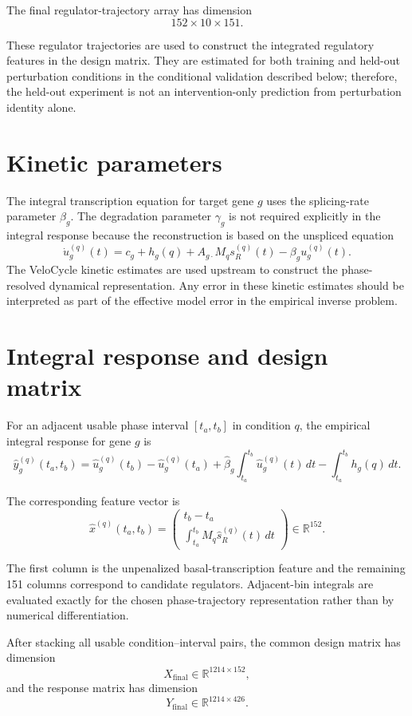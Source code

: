 \documentclass[supplement,onefignum,onetabnum]{siamart251216}
\begin{document}
The final regulator-trajectory array has dimension
\[
152\times10\times151.
\]

These regulator trajectories are used to construct the integrated regulatory features in the design matrix. They are estimated for both training and held-out perturbation conditions in the conditional validation described below; therefore, the held-out experiment is not an intervention-only prediction from perturbation identity alone.

\section{Kinetic parameters}

The integral transcription equation for target gene \(g\) uses the splicing-rate parameter \(\beta_g\). The degradation parameter \(\gamma_g\) is not required explicitly in the integral response because the reconstruction is based on the unspliced equation
\[
\dot u_g^{(q)}(t)=c_g+h_g(q)+A_{g\cdot}M_qs_R^{(q)}(t)-\beta_g u_g^{(q)}(t).
\]
The VeloCycle kinetic estimates are used upstream to construct the phase-resolved dynamical representation. Any error in these kinetic estimates should be interpreted as part of the effective model error in the empirical inverse problem.

\section{Integral response and design matrix}

For an adjacent usable phase interval \([t_a,t_b]\) in condition \(q\), the empirical integral response for gene \(g\) is
\[
\widehat y_g^{(q)}(t_a,t_b)
=
\widehat u_g^{(q)}(t_b)-\widehat u_g^{(q)}(t_a)
+\widehat\beta_g\int_{t_a}^{t_b}\widehat u_g^{(q)}(t)\,dt
-\int_{t_a}^{t_b}h_g(q)\,dt.
\]

The corresponding feature vector is
\[
\widehat x^{(q)}(t_a,t_b)
=
\begin{pmatrix}
t_b-t_a\\[2mm]
\displaystyle \int_{t_a}^{t_b}M_q\widehat s_R^{(q)}(t)\,dt
\end{pmatrix}
\in\mathbb{R}^{152}.
\]

The first column is the unpenalized basal-transcription feature and the remaining 151 columns correspond to candidate regulators. Adjacent-bin integrals are evaluated exactly for the chosen phase-trajectory representation rather than by numerical differentiation.

After stacking all usable condition--interval pairs, the common design matrix has dimension
\[
X_{\mathrm{final}}\in\mathbb{R}^{1214\times152},
\]
and the response matrix has dimension
\[
Y_{\mathrm{final}}\in\mathbb{R}^{1214\times426}.
\]
\end{document}
